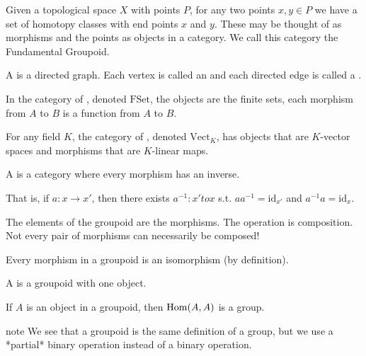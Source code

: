 \documentclass[11pt,leqno,oneside]{amsart}
\newenvironment{dateenv}{
  \vspace{1em}
}{
  \vspace{1em}
}
\newcommand{\mydate}[4]{
  \newdate{#1}{#2}{#3}{#4}
  \begin{dateenv}
    \hfill\displaydate{#1}
  \end{dateenv}
}
\numberwithin{thm}{section}
\newcommand{\id}{\text{id}}
\begin{document}
Given a topological space \(X\) with points \(P\), for any two points
\(x,y \in P\) we have a set of homotopy classes with end points \(x\)
and \(y\). These may be thought of as morphisms and the points as
objects in a category. We call this category the Fundamental Groupoid.

\mydate{d2}{20}{1}{2017}

\begin{defn}
  A  is a directed graph.  Each vertex is called an
   and each directed edge is called a .
\end{defn}
\begin{defn}
  In the category of , denoted $\text{FSet}$, the
  objects are the finite sets, each morphism from $A$ to $B$ is a
  function from $A$ to $B$.
\end{defn}
\begin{defn}
  For any field $K$, the category of , denoted
  $\text{Vect}_K$, has objects that are $K$-vector spaces and
  morphisms that are $K$-linear maps.
\end{defn}
\begin{defn}
  A  is a category where every morphism has an inverse.

  That is, if $a: x \to x'$, then there exists $a^{-1}:x' to x$
  s.t. $aa^{-1} = \id_{x'}$ and $a^{-1}a = \id_{x}$.

  The elements of the groupoid are the morphisms.  The operation is
  composition.  Not every pair of morphisms can necessarily be composed!
\end{defn}
\begin{prop}
  Every morphism in a groupoid is an isomorphism (by definition).
\end{prop}
\begin{defn}
  A  is a groupoid with one object.
\end{defn}
\begin{prop}
  If $A$ is an object in a groupoid, then $\operatorname{Hom}(A, A)$ is a group.
\end{prop}

note We see that a groupoid is the same definition of a group, but we
use a *partial* binary operation instead of a binary operation.
\end{document}
